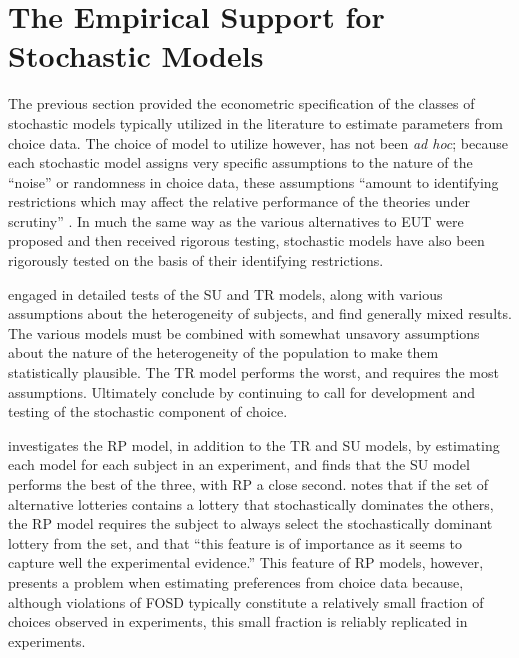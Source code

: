 \documentclass[../main.tex]{subfiles}
\begin{document}
\singlespacing
\section{The Empirical Support for Stochastic Models}
\doublespacing

The previous section provided the econometric specification of the classes of stochastic models typically utilized in the literature to estimate parameters from choice data.
The choice of model to utilize however, has not been \textit{ad hoc};
because each stochastic model assigns very specific assumptions to the nature of the \enquote{noise} or randomness in choice data, these assumptions \enquote{amount to identifying restrictions which may affect the relative performance of the theories under scrutiny} \parencite[1091]{Ballinger1997}.
In much the same way as the various alternatives to EUT were proposed and then received rigorous testing, stochastic models have also been rigorously tested on the basis of their identifying restrictions.

\textcite{Ballinger1997} engaged in detailed tests of the SU and TR models, along with various assumptions about the heterogeneity of subjects, and find generally mixed results.
The various models must be combined with somewhat unsavory assumptions about the nature of the heterogeneity of the population to make them statistically plausible.
The TR model performs the worst, and requires the most assumptions.
Ultimately \textcite[1104]{Ballinger1997} conclude by continuing to call for development and testing of the stochastic component of choice.

\textcite{Carbone1997} investigates the RP model, in addition to the TR and SU models, by estimating each model for each subject in an experiment, and finds that the SU model performs the best of the three, with RP a close second.
\textcite[307]{Carbone1997} notes that if the set of alternative lotteries contains a lottery that stochastically dominates the others, the RP model requires the subject to always select the stochastically dominant lottery from the set, and that \enquote{this feature is of importance as it seems to capture well the experimental evidence.}
This feature of RP models, however, presents a problem when estimating preferences from choice data because, although violations of FOSD typically constitute a relatively small fraction of choices observed in experiments, this small fraction is reliably replicated in experiments.
\end{document}
